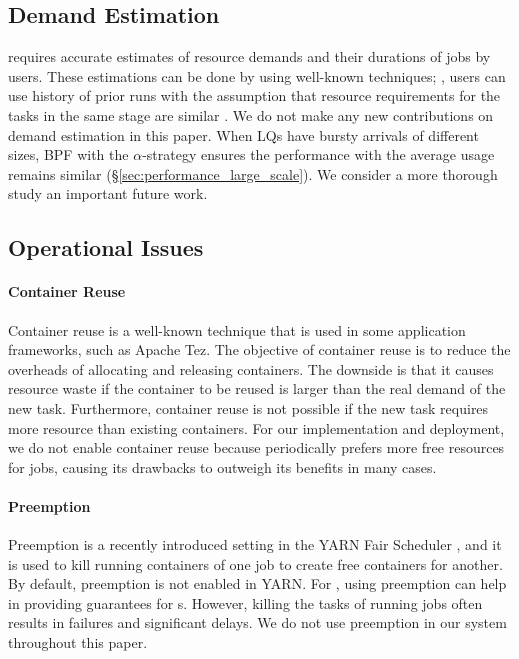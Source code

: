 
\subsection{Demand Estimation}

\name requires accurate estimates of resource demands and their durations of \burstq jobs by users. 
These estimations can be done by using well-known techniques; \eg, users can use history of prior runs \cite{rope, jockey, tetris} with the assumption that resource requirements for the tasks in the same stage are similar \cite{drf, pacman, paratimer}. 
We do not make any new contributions on demand estimation in this paper. 
When LQs have bursty arrivals of different sizes, BPF with the $\alpha$-strategy ensures the performance with the average usage remains similar (\S\ref{sec:performance_large_scale}). 
We consider a more thorough study an important future work. 

\subsection{Operational Issues}

\paragraph{Container Reuse}
Container reuse is a well-known technique that is used in some application frameworks, such as Apache Tez. 
The objective of container reuse is to reduce the overheads of allocating and releasing containers. 
The downside is that it causes resource waste if the container to be reused is larger than the real demand of the new task. 
Furthermore, container reuse is not possible if the new task requires more resource than existing containers. 
For our implementation and deployment, we do not enable container reuse because {\name} periodically prefers more free resources for \burstq jobs, causing its drawbacks to outweigh its benefits in many cases.

\paragraph{Preemption}
Preemption is a recently introduced setting in the YARN Fair Scheduler \cite{hadoop-fair-scheduler}, and it is used to kill running containers of one job to create free containers for another. 
By default, preemption is not enabled in YARN. 
For {\name}, using preemption can help in providing guarantees for {\burstq}s. 
However, killing the tasks of running jobs often results in failures and significant delays. 
We do not use preemption in our system throughout this paper.


